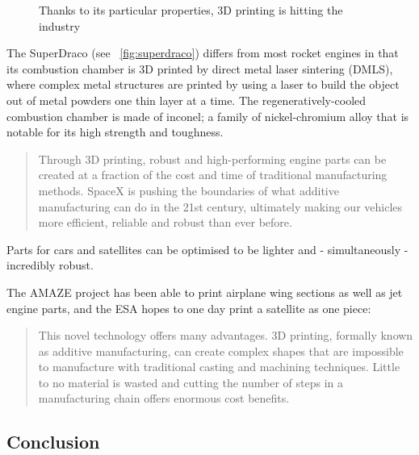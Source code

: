 \begin{figure}[h]
\centering
    \hfil
    \caption{Thanks to its particular properties, 3D printing is hitting the industry}
    \label{fig:3D_printed_objects}
\end{figure}

The SuperDraco (see \figurename~\ref{fig:superdraco}) differs from most rocket engines in that its combustion chamber is 3D printed by direct metal laser sintering (DMLS), where complex metal structures are printed by using a laser to build the object out of metal powders one thin layer at a time. The regeneratively-cooled combustion chamber is made of inconel; a family of nickel-chromium alloy that is notable for its high strength and toughness.

\begin{quotation}
    Through 3D printing, robust and high-performing engine parts can be created at a fraction of the cost and time of traditional manufacturing methods. SpaceX is pushing the boundaries of what additive manufacturing can do in the 21st century, ultimately making our vehicles more efficient, reliable and robust than ever before.
\end{quotation}


Parts for cars and satellites can be optimised to be lighter and - simultaneously - incredibly robust.

The AMAZE project has been able to print airplane wing sections as well as jet engine parts, and the ESA hopes to one day print a satellite as one piece:
\begin{quotation}
    This novel technology offers many advantages. 3D printing, formally known as additive manufacturing, can create complex shapes that are impossible to manufacture with traditional casting and machining techniques. Little to no material is wasted and cutting the number of steps in a manufacturing chain offers enormous cost benefits.
\end{quotation}




\subsection{Conclusion} %

